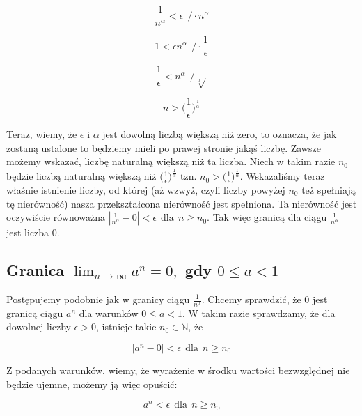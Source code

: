 \documentclass[a4paper,oneside,openright,11pt]{article}
\numberwithin{equation}{section}
\begin{document}
\begin{equation*}
    \frac{1}{n^\alpha} < \epsilon \ \  / \cdot n^\alpha
\end{equation*}

\begin{equation*}
    1 < \epsilon n^\alpha \ \  / \cdot \frac{1}{\epsilon}
\end{equation*}

\begin{equation*}
    \frac{1}{\epsilon} < n^\alpha \ \  / \sqrt[\alpha]{}
\end{equation*}

\begin{equation*}
    n > \big(\frac{1}{\epsilon}\big)^{\frac{1}{\alpha}}
\end{equation*}


Teraz, wiemy, że $\epsilon$ i $\alpha$ jest dowolną liczbą większą niż zero, to oznacza, że jak zostaną ustalone to będziemy mieli
po prawej stronie jakąś liczbę. Zawsze możemy wskazać, liczbę naturalną większą niż ta liczba. Niech w takim razie $n_0$ będzie
liczbą naturalną większą niż $\big(\frac{1}{\epsilon}\big)^{\frac{1}{\alpha}}$ tzn. $n_{0} > \big(\frac{1}{\epsilon}\big)^{\frac{1}{\alpha}}$.
Wskazaliśmy teraz właśnie istnienie liczby, od której (aż wzwyż, czyli liczby powyżej $n_0$ też spełniają tę nierówność) nasza przekształcona nierówność
jest spełniona. Ta nierówność jest oczywiście równoważna $|\frac{1}{n^\alpha} - 0| < \epsilon \ \ \textrm{dla} \ \ n \geq n_0$.
Tak więc granicą dla ciągu $\frac{1}{n^{\alpha}}$ jest liczba $0$.


\subsection{Granica $\lim_{n\to\infty} a^{n} = 0,$ gdy $0 \leq a < 1$}


Postępujemy podobnie jak w granicy ciągu $\frac{1}{n^{\alpha}}$. Chcemy sprawdzić, że $0$ jest granicą ciągu $a^n$ dla warunków $0 \leq a < 1$.
W takim razie sprawdzamy, że dla dowolnej liczby $\epsilon > 0$, istnieje takie $n_0 \in \mathbb{N}$, że

\begin{equation*}
    |a^{n} - 0| < \epsilon \ \ \textrm{dla} \ \ n \geq n_0
\end{equation*}


\noindent
Z podanych warunków, wiemy, że wyrażenie w środku wartości bezwzględnej nie będzie ujemne, możemy ją więc opuścić:

\begin{equation*}
    a^{n}  < \epsilon \ \ \textrm{dla} \ \ n \geq n_0
\end{equation*}
\end{document}
